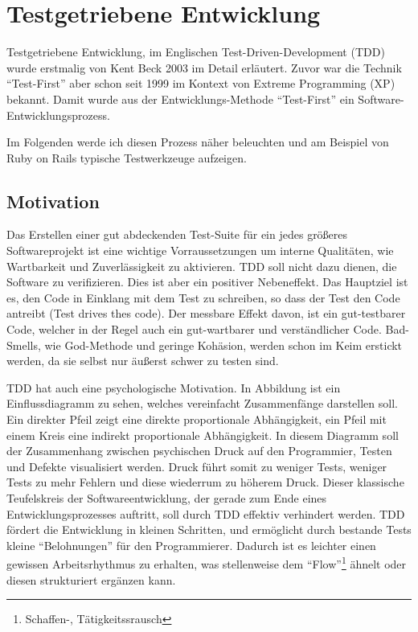 \section{Testgetriebene Entwicklung}
Testgetriebene Entwicklung, im Englischen Test-Driven-Development (TDD) wurde erstmalig von Kent Beck 2003 im Detail erläutert. Zuvor war die Technik "`Test-First"' aber schon seit 1999 im Kontext von Extreme Programming (XP) bekannt.
Damit wurde aus der Entwicklungs-Methode "`Test-First"' ein Software-Entwicklungsprozess. 

Im Folgenden werde ich diesen Prozess näher beleuchten und am Beispiel von Ruby on Rails typische Testwerkzeuge aufzeigen. \subsection{Motivation}
  Das Erstellen einer gut abdeckenden Test-Suite für ein jedes größeres Softwareprojekt ist eine wichtige Vorraussetzungen um interne Qualitäten, wie Wartbarkeit und Zuverlässigkeit zu aktivieren. TDD soll nicht dazu dienen, die Software zu verifizieren. Dies ist aber ein positiver Nebeneffekt. Das Hauptziel ist es, den Code in Einklang mit dem Test zu schreiben, so dass der Test den Code antreibt (Test drives thes code). Der messbare Effekt davon, ist ein gut-testbarer Code, welcher in der Regel auch ein gut-wartbarer und verständlicher Code. Bad-Smells, wie God-Methode und geringe Kohäsion, werden schon im Keim erstickt werden, da sie selbst nur äußerst schwer zu testen sind.
  
  
  TDD hat auch eine psychologische Motivation.
  In Abbildung %
  ist ein Einflussdiagramm zu sehen, welches vereinfacht Zusammenfänge darstellen soll. Ein direkter Pfeil zeigt eine direkte proportionale Abhängigkeit, ein Pfeil mit einem Kreis eine indirekt proportionale Abhängigkeit. In diesem Diagramm soll der Zusammenhang zwischen psychischen Druck auf den Programmier, Testen und Defekte visualisiert werden. Druck führt somit zu weniger Tests, weniger Tests zu mehr Fehlern und diese wiederrum zu höherem Druck. Dieser klassische Teufelskreis der Softwareentwicklung, der gerade zum Ende eines Entwicklungsprozesses auftritt, soll durch TDD effektiv verhindert werden. 
  TDD fördert die Entwicklung in kleinen Schritten, und ermöglicht durch bestande Tests kleine "`Belohnungen"' für den Programmierer. Dadurch ist es leichter einen gewissen Arbeitsrhythmus zu erhalten, was stellenweise dem "`Flow"'\footnote{Schaffen-, Tätigkeitssrausch}  ähnelt oder diesen strukturiert ergänzen kann.
  

